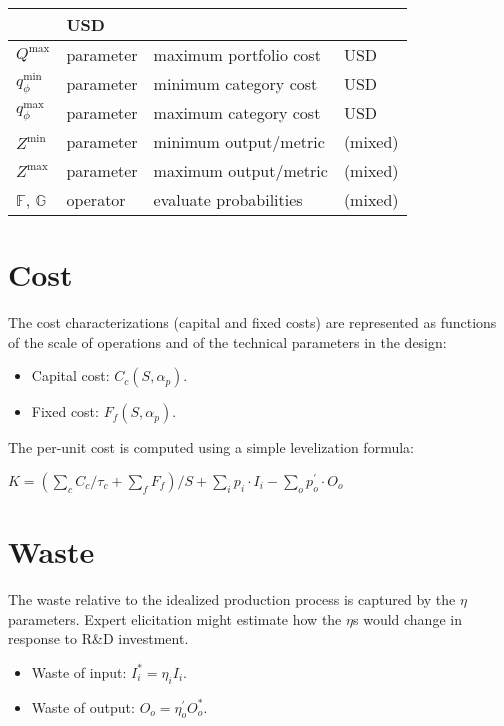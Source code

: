 \documentclass[letterpaper,10pt,english]{sphinxmanual}
\begin{document}
\begin{savenotes}
\begin{longtable}{|l|l|l|l|}
&
USD
\\
\hline
\(Q^\mathrm{max}\)
&
parameter
&
maximum portfolio cost
&
USD
\\
\hline
\(q^\mathrm{min}_\phi\)
&
parameter
&
minimum category cost
&
USD
\\
\hline
\(q^\mathrm{max}_\phi\)
&
parameter
&
maximum category cost
&
USD
\\
\hline
\(Z^\mathrm{min}\)
&
parameter
&
minimum output/metric
&
(mixed)
\\
\hline
\(Z^\mathrm{max}\)
&
parameter
&
maximum output/metric
&
(mixed)
\\
\hline
\(\mathbb{F}\), \(\mathbb{G}\)
&
operator
&
evaluate probabilities
&
(mixed)
\\
\hline
\end{longtable}\sphinxatlongtableend\end{savenotes}


\section{Cost}
\label{\detokenize{doc-src/formulation:cost}}
The cost characterizations (capital and fixed costs) are represented as
functions of the scale of operations and of the technical parameters in
the design:
\begin{itemize}
\item {} 
Capital cost: \(C_c(S, \alpha_p)\).

\item {} 
Fixed cost: \(F_f(S, \alpha_p)\).

\end{itemize}

The per-unit cost is computed using a simple levelization formula:

\(K = \left( \sum_c C_c / \tau_c + \sum_f F_f \right) / S + \sum_i p_i \cdot I_i - \sum_o p^\prime_o \cdot O_o\)


\section{Waste}
\label{\detokenize{doc-src/formulation:waste}}
The waste relative to the idealized production process is captured by
the \(\eta\) parameters. Expert elicitation might estimate how the
\(\eta\)s would change in response to R\&D investment.
\begin{itemize}
\item {} 
Waste of input: \(I^*_i = \eta_i I_i\).

\item {} 
Waste of output: \(O_o = \eta^\prime_o O^*_o\).

\end{itemize}
\end{document}
